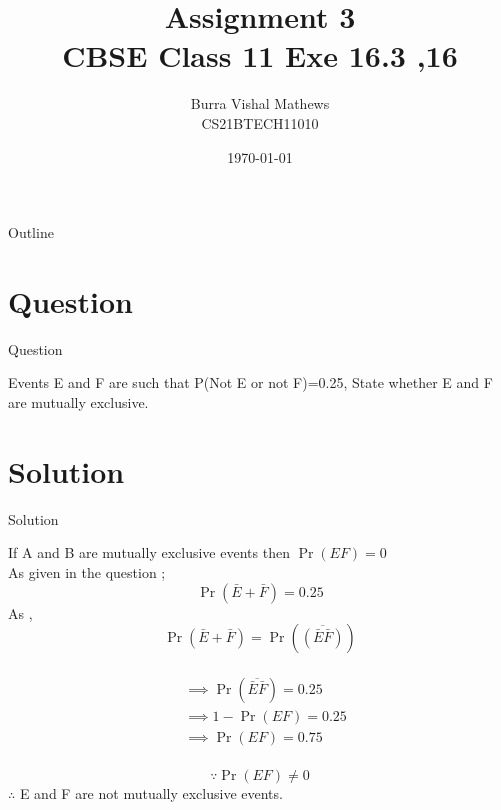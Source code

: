 \documentclass{beamer}
\title{Assignment 3 \\ CBSE Class 11 Exe 16.3 ,16}
\author{Burra Vishal Mathews \\ CS21BTECH11010}
\date{\today}
\providecommand{\pr}[1]{\ensuremath{\Pr\left(#1\right)}}
\begin{document}
\begin{frame}
    \titlepage 
\end{frame}

\logo{}


\begin{frame}{Outline}
    \tableofcontents
\end{frame}


\section{Question}
\begin{frame}{Question}

Events E and F are such that P(Not E or not F)=0.25, State whether E and F are mutually exclusive.

\end{frame}


\section{Solution}
\begin{frame}{Solution}

    If A and B are mutually exclusive events then $\pr{EF}=0$\\
    As given in the question ;
    $$\pr{\bar E+\bar F}=0.25 $$
    As , $$\pr{\bar E+\bar F}=\pr{\overline{(\bar E \bar F)}}$$\\
    
    \begin{align*}
        &\implies \pr{\overline{\bar E \bar F}}=0.25\\
        &\implies 1-\pr{EF}=0.25\\
        &\implies \pr{EF}=0.75\\
    \end{align*}
    
\end{frame} 

\begin{frame}
    $$\because \pr{EF}\neq 0$$
    $\therefore$ E and F are not mutually exclusive events.

    
\end{frame}
\end{document}
